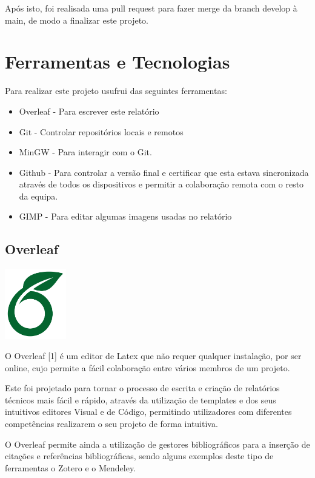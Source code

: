 \documentclass[a4paper,12pt]{article}
\begin{document}
\vspace{0.3cm}

Após isto, foi realisada uma pull request para fazer merge da branch develop à main, de modo a finalizar este projeto.

\newpage

\section{Ferramentas e Tecnologias}
Para realizar este projeto usufrui das seguintes ferramentas:
\begin{itemize}
    \item Overleaf - Para escrever este relatório
    \item Git - Controlar repositórios locais e remotos
    \item MinGW - Para interagir com o Git.
    \item Github - Para  controlar a versão final e certificar que esta estava sincronizada através de todos os dispositivos e permitir a colaboração remota com o resto da equipa.
    \item GIMP - Para editar algumas imagens usadas no relatório
\end{itemize}

\subsection{Overleaf}
    \includegraphics[width=0.2\textwidth]{overleaf.jpg} %
    \vspace{0.5cm}

O Overleaf [1] é um editor de Latex que não requer qualquer instalação, por ser online, cujo permite a fácil colaboração entre vários membros de um projeto.

Este foi projetado para tornar o processo de escrita e criação de relatórios técnicos mais fácil e rápido, através da utilização de templates e dos seus intuitivos editores Visual e de Código, permitindo utilizadores com diferentes competências realizarem o seu projeto de forma intuitiva.

O Overleaf permite ainda a utilização de gestores bibliográficos para a inserção de citações e referências bibliográficas, sendo alguns exemplos deste tipo de ferramentas o Zotero e o Mendeley.
\end{document}
